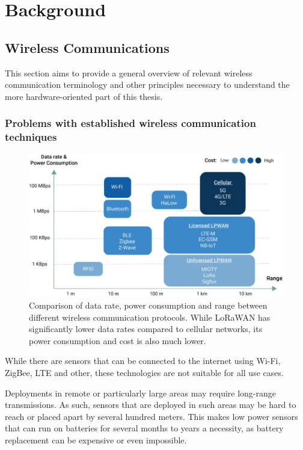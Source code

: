 \chapter{Background}

\section{Wireless Communications}

This section aims to provide a general overview of relevant wireless communication terminology and other principles necessary to understand the more hardware-oriented part of this thesis.

\subsection{Problems with established wireless communication techniques}

\begin{figure}[htbp]
    \centering
    \includegraphics[width=1\textwidth]{pictures/lora/comparison-wireless-protocols.png}
    \caption{
        Comparison of data rate, power consumption and range between different wireless communication protocols.
        While \ac{LoRaWAN} has significantly lower data rates compared to cellular networks, its power consumption and cost is also much lower.~\protect\cite{wang_comparison_2021}
    }\label{pic:wireless-protocols-comparison}
\end{figure}

While there are sensors that can be connected to the internet using Wi-Fi, ZigBee, \ac{LTE} and other, these technologies are not suitable for all use cases.

Deployments in remote or particularly large areas may require long-range transmissions.
As such, sensors that are deployed in such areas may be hard to reach or placed apart by several hundred meters.
This makes low power sensors that can run on batteries for several months to years a necessity, as battery replacement can be expensive or even impossible.

